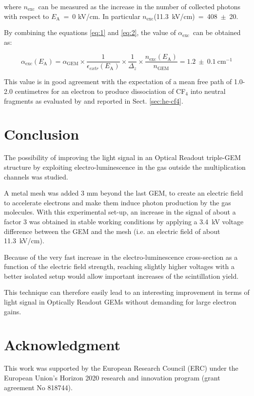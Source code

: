 \documentclass[a4paper,11pt]{article}
\newcommand{\Ea}  {$E_{\mathrm{A}}$}
\newcommand{\nm}  {$n_{\mathrm{exc}}$}
\newcommand{\aex}  {$\alpha_{\mathrm{exc}}$}
\begin{document}
where \nm\ can be measured as the increase in the number of collected photons with respect to \Ea~=~0 kV/cm. 
In particular $n_{\mathrm{exc}}$(11.3~kV/cm)~=~408~$\pm$~20.

By combining the equations \ref{eq:1} and \ref{eq:2}, the value of \aex\ can be obtained as:

\begin{equation}
\alpha_{\mathrm{exc}}(E_{\mathrm{A}}) = \alpha_{\mathrm{GEM}} \times \frac{1}{\epsilon_{extr}(E_{\mathrm{A}})} \times \frac{1}{\Delta_z} \times \frac{n_{\mathrm{exc}}(E_{\mathrm{A}})}{n_{\mathrm{GEM}}} = 1.2~\pm~0.1~{\mathrm{cm}} ^{-1}
\end{equation}

This value is in good agreement with the expectation of a mean free path of 1.0-2.0 centimetres for an electron to produce dissociation of CF$_4$ into neutral fragments as evaluated by \cite{bib:Fraga_beaune} and reported in Sect. \ref{sec:he-cf4}.

\section{Conclusion}

The possibility of improving the light signal in an Optical Readout triple-GEM structure by exploiting electro-luminescence in the gas outside the multiplication channels was studied.

A metal mesh was added 3 mm beyond the last GEM, to create an electric field to accelerate electrons and make them induce photon production by the gas molecules.
With this experimental set-up, an increase in the signal of about a factor 3 was obtained in stable working conditions by applying a 3.4~kV  voltage difference between the GEM and the mesh (i.e. an electric field of about 11.3~kV/cm).

Because of the very fast increase in the electro-luminescence cross-section as a function of the electric field strength, 
reaching slightly higher voltages with a better isolated setup would allow important increases of the scintillation yield. 

This technique can therefore easily lead to an interesting improvement in terms of light 
signal in Optically Readout GEMs without demanding for large electron gains.

\section*{Acknowledgment}
This work was supported by the European Research Council (ERC) under the European Union's Horizon 2020 research and innovation program (grant agreement No 818744).



{}

\end{document}
